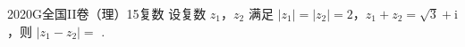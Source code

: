
\begin{problem}{2020}{G}{全国II卷（理）}{15}{复数}
设复数 $ z_1 $，$ z_2 $ 满足 $ |z_1| = |z_2| = 2 $，$ z_1 + z_2 = \sqrt{3} + \mathrm{i} $，则 $ |z_1 - z_2| = $ \underline{\hspace{4em}}.
\end{problem}

\begin{answer}

\end{answer}

\begin{solutions}

\end{solutions}